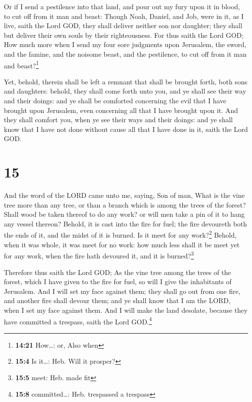  Or if I send a pestilence into that land, and pour out
my fury upon it in blood, to cut off from it man and beast:
 Though Noah, Daniel, and Job, were in it, as I live,
saith the Lord GOD, they shall deliver neither son nor daughter; they
shall but deliver their own souls by their righteousness.
 For thus saith the Lord GOD; How much more when I send
my four sore judgments upon Jerusalem, the sword, and the famine, and
the noisome beast, and the pestilence, to cut off from it man and
beast?\footnote{\textbf{14:21} How\ldots: or, Also when}

 Yet, behold, therein shall be left a remnant that shall
be brought forth, both sons and daughters: behold, they shall come forth
unto you, and ye shall see their way and their doings: and ye shall be
comforted concerning the evil that I have brought upon Jerusalem, even
concerning all that I have brought upon it.  And they
shall comfort you, when ye see their ways and their doings: and ye shall
know that I have not done without cause all that I have done in it,
saith the Lord GOD.

\hypertarget{section-14}{%
\section{15}\label{section-14}}

 And the word of the LORD came unto me, saying,
 Son of man, What is the vine tree more than any tree, or
than a branch which is among the trees of the forest? 
Shall wood be taken thereof to do any work? or will men take a pin of it
to hang any vessel thereon?  Behold, it is cast into the
fire for fuel; the fire devoureth both the ends of it, and the midst of
it is burned. Is it meet for any work?\footnote{\textbf{15:4} Is
  it\ldots: Heb. Will it prosper?}  Behold, when it was
whole, it was meet for no work: how much less shall it be meet yet for
any work, when the fire hath devoured it, and it is burned?\footnote{\textbf{15:5}
  meet: Heb. made fit}

 Therefore thus saith the Lord GOD; As the vine tree among
the trees of the forest, which I have given to the fire for fuel, so
will I give the inhabitants of Jerusalem.  And I will set
my face against them; they shall go out from one fire, and another fire
shall devour them; and ye shall know that I am the LORD, when I set my
face against them.  And I will make the land desolate,
because they have committed a trespass, saith the Lord GOD.\footnote{\textbf{15:8}
  committed\ldots: Heb. trespassed a trespass}

